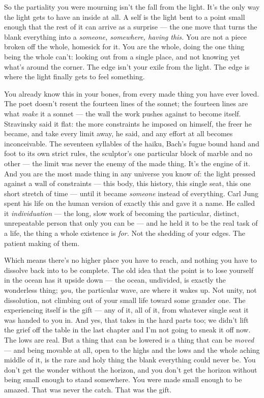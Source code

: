 \documentclass[11pt,openany]{book}
\begin{document}
So the partiality you were mourning isn’t the fall from the light. It’s the only way the light gets to have an inside at all. A self is the light bent to a point small enough that the rest of it can arrive as a surprise — the one move that turns the blank everything into a \textit{someone, somewhere, having this.} You are not a piece broken off the whole, homesick for it. You are the whole, doing the one thing being the whole can’t: looking out from a single place, and not knowing yet what’s around the corner. The edge isn’t your exile from the light. The edge is where the light finally gets to feel something.

You already know this in your bones, from every made thing you have ever loved. The poet doesn’t resent the fourteen lines of the sonnet; the fourteen lines are what \textit{make} it a sonnet — the wall the work pushes against to become itself. Stravinsky said it flat: the more constraints he imposed on himself, the freer he became, and take every limit away, he said, and any effort at all becomes inconceivable. The seventeen syllables of the haiku, Bach’s fugue bound hand and foot to its own strict rules, the sculptor’s one particular block of marble and no other — the limit was never the enemy of the made thing. It’s the engine of it. And you are the most made thing in any universe you know of: the light pressed against a wall of constraints — this body, this history, this single seat, this one short stretch of time — until it became \textit{someone} instead of everything. Carl Jung spent his life on the human version of exactly this and gave it a name. He called it \textit{individuation} — the long, slow work of becoming the particular, distinct, unrepeatable person that only you can be — and he held it to be the real task of a life, the thing a whole existence is \textit{for.} Not the shedding of your edges. The patient making of them.

Which means there’s no higher place you have to reach, and nothing you have to dissolve back into to be complete. The old idea that the point is to lose yourself in the ocean has it upside down — the ocean, undivided, is exactly the wonderless thing; \textit{you,} the particular wave, are where it wakes up. Not unity, not dissolution, not climbing out of your small life toward some grander one. The experiencing itself is the gift — any of it, all of it, from whatever single seat it was handed to you in. And yes, that takes in the hard parts too; we didn’t lift the grief off the table in the last chapter and I’m not going to sneak it off now. The lows are real. But a thing that can be lowered is a thing that can be \textit{moved} — and being movable at all, open to the highs and the lows and the whole aching middle of it, is the rare and holy thing the blank everything could never be. You don’t get the wonder without the horizon, and you don’t get the horizon without being small enough to stand somewhere. You were made small enough to be amazed. That was never the catch. That was the gift.
\end{document}
